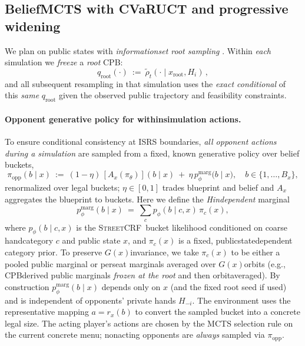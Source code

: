 \documentclass[10pt]{article}
\newcommand{\sCRF}{\textsc{Street\textendash CRF}\xspace}
\newcommand{\1}{\mathbf{1}}
\theoremstyle{plain}
\begin{document}
\subsection{Belief\textendash MCTS with CVaR\textendash UCT and progressive widening}
\label{sec:belief_mcts}
We plan on public states with \emph{information\textendash set root sampling} \citep{silver2010pomcp,cowling2012ismcts}. Within \emph{each} simulation we \emph{freeze} a \emph{root} CPB:
\[
q_{\text{root}}(\cdot)\ :=\ \tilde\rho_t(\cdot\mid x_{\text{root}},H_i)\,,
\]
and all subsequent resampling in that simulation uses the \emph{exact conditional} of this \emph{same} $q_{\text{root}}$ given the observed public trajectory and feasibility constraints.

\paragraph{Opponent generative policy for within\textendash simulation actions.}
To ensure conditional consistency at IS\textendash RS boundaries, \emph{all opponent actions during a simulation} are sampled from a fixed, known generative policy over belief buckets,
\[
\pi_{\mathrm{opp}}(b\mid x)\ :=\ (1-\eta)\,[A_x(\pi_\theta)](b\mid x)\ +\ \eta\,p_\phi^{\text{marg}}\!\big(b\mid x\big),\quad b\in\{1,\dots,B_x\},
\]
renormalized over legal buckets; $\eta\in[0,1]$ trades blueprint and belief and $A_x$ aggregates the blueprint to buckets. Here we define the \emph{H\textendash independent} marginal
\[
p_\phi^{\text{marg}}(b\mid x)\ =\ \sum_{c} p_\phi(b\mid c,x)\,\pi_c(x),
\]
where $p_\phi(b\mid c,x)$ is the \sCRF\ bucket likelihood conditioned on coarse hand\textendash category $c$ and public state $x$, and $\pi_c(x)$ is a fixed, public\textendash state\textendash dependent category prior. To preserve $G(x)$\textendash invariance, we take $\pi_c(x)$ to be either a pooled public marginal or per\textendash seat marginals averaged over $G(x)$\textendash orbits (e.g., CPB\textendash derived public marginals \emph{frozen at the root} and then orbit\textendash averaged). By construction $p_\phi^{\text{marg}}(b\mid x)$ depends only on $x$ (and the fixed root seed if used) and is independent of opponents’ private hands $H_{-i}$. The environment uses the representative mapping $a=r_x(b)$ to convert the sampled bucket into a concrete legal size. The acting player’s actions are chosen by the MCTS selection rule on the current concrete menu; non\textendash acting opponents are \emph{always} sampled via $\pi_{\mathrm{opp}}$.
\end{document}
